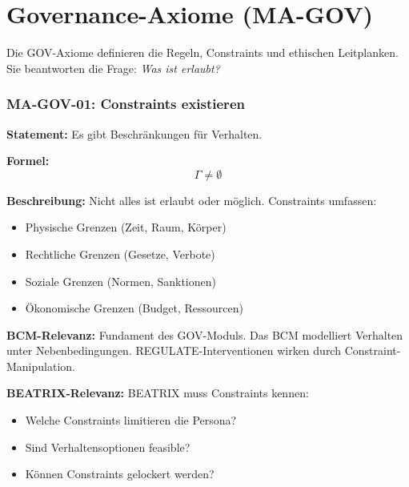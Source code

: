 
\section{Governance-Axiome (MA-GOV)}

Die GOV-Axiome definieren die Regeln, Constraints und ethischen Leitplanken.
Sie beantworten die Frage: \textit{Was ist erlaubt?}


\subsubsection*{MA-GOV-01: Constraints existieren}

\textbf{Statement:} Es gibt Beschränkungen für Verhalten.

\textbf{Formel:}
\begin{equation}
\Gamma \neq \emptyset
\end{equation}

\textbf{Beschreibung:}
Nicht alles ist erlaubt oder möglich. Constraints umfassen:
\begin{itemize}
    \item Physische Grenzen (Zeit, Raum, Körper)
    \item Rechtliche Grenzen (Gesetze, Verbote)
    \item Soziale Grenzen (Normen, Sanktionen)
    \item Ökonomische Grenzen (Budget, Ressourcen)
\end{itemize}

\textbf{BCM-Relevanz:}
Fundament des GOV-Moduls. Das BCM modelliert Verhalten unter Nebenbedingungen. REGULATE-Interventionen wirken durch Constraint-Manipulation.

\textbf{BEATRIX-Relevanz:}
BEATRIX muss Constraints kennen:
\begin{itemize}
    \item Welche Constraints limitieren die Persona?
    \item Sind Verhaltensoptionen feasible?
    \item Können Constraints gelockert werden?
\end{itemize}

